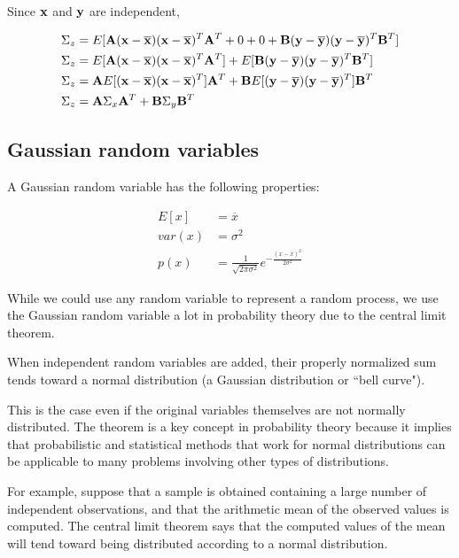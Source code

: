 Since $\mathbf{x}$ and $\mathbf{y}$ are independent,

\begin{align*}
  \Sigma_z &= E[
    \mathbf{A}(\mathbf{x} - \overline{\mathbf{x}})(\mathbf{x} - \overline{\mathbf{x}})^T\mathbf{A}^T + 0 + 0 +
    \mathbf{B}(\mathbf{y} - \overline{\mathbf{y}})(\mathbf{y} - \overline{\mathbf{y}})^T\mathbf{B}^T] \\
  \Sigma_z &=
    E[\mathbf{A}(\mathbf{x} - \overline{\mathbf{x}})(\mathbf{x} - \overline{\mathbf{x}})^T\mathbf{A}^T] +
    E[\mathbf{B}(\mathbf{y} - \overline{\mathbf{y}})(\mathbf{y} - \overline{\mathbf{y}})^T\mathbf{B}^T] \\
  \Sigma_z &=
    \mathbf{A}E[(\mathbf{x} - \overline{\mathbf{x}})(\mathbf{x} - \overline{\mathbf{x}})^T]\mathbf{A}^T +
    \mathbf{B}E[(\mathbf{y} - \overline{\mathbf{y}})(\mathbf{y} - \overline{\mathbf{y}})^T]\mathbf{B}^T \\
  \Sigma_z &=\mathbf{A}\Sigma_x\mathbf{A}^T + \mathbf{B}\Sigma_y\mathbf{B}^T
\end{align*}

\subsection{Gaussian random variables}

A Gaussian random variable has the following properties:

\begin{align*}
  E[x] &= \overline{x} \\
  var(x) &= \sigma^2 \\
  p(x) &= \frac{1}{\sqrt{2\pi\sigma^2}}
    e^{-\frac{(x - \overline{x})^2}{2\sigma^2}}
\end{align*}

While we could use any random variable to represent a random process, we use the
Gaussian random variable a lot in probability theory due to the central limit
theorem.

\begin{definition}
  When independent random variables are added, their properly normalized sum
  tends toward a normal distribution (a Gaussian distribution or ``bell curve").
\end{definition}

This is the case even if the original variables themselves are not normally
distributed. The theorem is a key concept in probability theory because it
implies that probabilistic and statistical methods that work for normal
distributions can be applicable to many problems involving other types of
distributions.

For example, suppose that a sample is obtained containing a large number of
independent observations, and that the arithmetic mean of the observed values
is computed. The central limit theorem says that the computed values of the
mean will tend toward being distributed according to a normal distribution.
